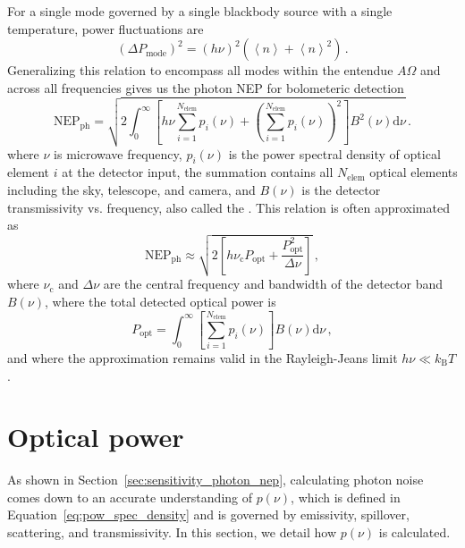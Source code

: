 For a single mode governed by a single blackbody source with a single temperature, power fluctuations are 
\begin{equation}
    \left(\Delta P_{\mathrm{mode}} \right)^{2} = \left(h \nu \right)^{2} \left( \left< n \right> + \left< n \right>^{2} \right) \, .
    \label{eq:photon_power_fluctuations_single_mode}
\end{equation}
Generalizing this relation to encompass all modes within the entendue $A \Omega$ and across all frequencies gives us the photon NEP for bolometeric detection
\begin{equation}
    \mathrm{NEP}_{\mathrm{ph}} = \sqrt{2 \int_{0}^{\infty} \left[ h \nu \sum_{i=1}^{N_{\mathrm{elem}}} p_{i} (\nu) + \left( \sum_{i=1}^{N_{\mathrm{elem}}} p_{i} (\nu) \right)^{2} \right] B^{2}(\nu) \mathrm{d} \nu} \, .
    \label{eq:nep_ph}
\end{equation}
where $\nu$ is microwave frequency, $p_{i}(\nu)$ is the power spectral density of optical element $i$ at the detector input, the summation contains all $N_{\mathrm{elem}}$ optical elements including the sky, telescope, and camera, and $B(\nu)$ is the detector transmissivity vs. frequency, also called the . This relation is often approximated as
\begin{equation}
    \mathrm{NEP_{ph}} \approx \sqrt{2 \left[ h \nu_{\mathrm{c}} P_{\mathrm{opt}} + \frac{P_{\mathrm{opt}}^{2}}{\Delta \nu} \right]} \, ,
\end{equation}
where $\nu_{\mathrm{c}}$ and $\Delta \nu$ are the central frequency and bandwidth of the detector band $B(\nu)$, where the total detected optical power is
\begin{equation}
    P_{\mathrm{opt}} = \int_{0}^{\infty} \left[ \sum_{i=1}^{N_{\mathrm{elem}}} p_{i}(\nu) \right] B(\nu) \mathrm{d} \nu \, ,
    \label{eq:popt}
\end{equation}
and where the approximation remains valid in the Rayleigh-Jeans limit $h \nu \ll k_{\mathrm{B}} T$.


\section{Optical power}
\label{sec:sensitivity_optical_power}

As shown in Section~\ref{sec:sensitivity_photon_nep}, calculating photon noise comes down to an accurate understanding of $p(\nu)$, which is defined in Equation~\ref{eq:pow_spec_density} and is governed by emissivity, spillover, scattering, and transmissivity. In this section, we detail how $p(\nu)$ is calculated.

